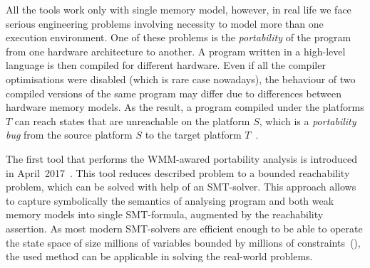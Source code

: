 All the  tools work only with single memory model, however, in real life we face serious engineering problems involving necessity to model more than one execution environment. One of these problems is the \textit{portability} of the program from one hardware architecture to another. A program written in a high-level language is then compiled for different hardware. Even if all the compiler optimisations were disabled (which is rare case nowadays), the behaviour of two compiled versions of the same program may differ due to differences between hardware memory models.
As the result, a program compiled under the platforms $T$ can reach states that are unreachable on the platform $S$, which is a \textit{portability bug} from the source platform $S$ to the target platform $T$~\cite{Porthos17}.

The first tool that performs the WMM-awared portability analysis is  introduced in April~2017~\cite{Porthos17}. This tool reduces described problem to a bounded reachability problem, which can be solved with help of an SMT-solver. This approach allows to capture symbolically the semantics of analysing program and both weak memory models into single SMT-formula, augmented by the reachability assertion. As most modern SMT-solvers are efficient enough to be able to operate the state space of size millions of variables bounded by millions of constraints~(\cite{malik2009boolean}), the used method can be applicable in solving the real-world problems.



